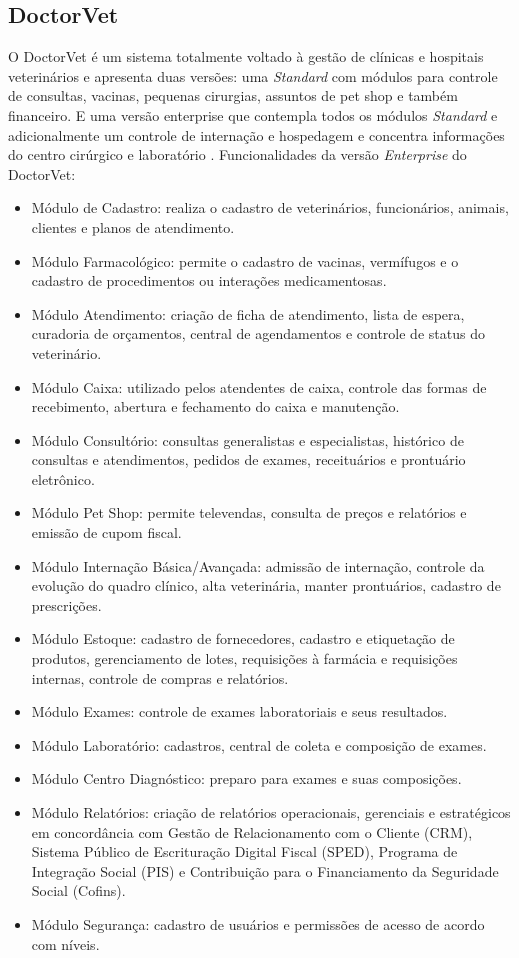 \documentclass[
    12pt,               %
    openright,          %
    oneside,
    a4paper,            %
    BIBLATEX,           %
    TODO,               %
    english,            %
    brazil              %
    ]{ifsp-spo-inf-ctds}
\begin{document}
        \subsection{DoctorVet}
        O DoctorVet é um sistema totalmente voltado à gestão de clínicas e hospitais veterinários e apresenta duas versões: uma \emph{Standard} com módulos para controle de consultas, vacinas, pequenas cirurgias, assuntos de pet shop e também financeiro. E uma versão enterprise que contempla todos os módulos \emph{Standard} e adicionalmente um controle de internação e hospedagem e concentra informações do centro cirúrgico e laboratório .  Funcionalidades da versão \emph{Enterprise} do DoctorVet:

\begin{itemize}
    \item Módulo de Cadastro: realiza o cadastro de veterinários, funcionários, animais, clientes e planos de atendimento.
    \item Módulo Farmacológico: permite o cadastro de vacinas, vermífugos e o cadastro de procedimentos ou interações medicamentosas.
    \item Módulo Atendimento: criação de ficha de atendimento, lista de espera, curadoria de orçamentos, central de   agendamentos e controle de status do veterinário.
    \item Módulo Caixa: utilizado pelos atendentes de caixa, controle das formas de recebimento, abertura e fechamento do caixa e manutenção.
    \item Módulo Consultório: consultas generalistas e especialistas, histórico de consultas e atendimentos, pedidos de exames, receituários e prontuário eletrônico.
    \item Módulo Pet Shop: permite televendas, consulta de preços e relatórios e emissão de cupom fiscal.
    \item Módulo Internação Básica/Avançada: admissão de internação, controle da evolução do quadro clínico, alta veterinária, manter prontuários, cadastro de prescrições.
    \item Módulo Estoque: cadastro de fornecedores, cadastro e etiquetação de produtos, gerenciamento de lotes, requisições à farmácia e requisições internas, controle de compras e relatórios.
    \item Módulo Exames: controle de exames laboratoriais e seus resultados.
    \item Módulo Laboratório: cadastros, central de coleta e composição de exames.
    \item Módulo Centro Diagnóstico: preparo para exames e suas composições.
    \item Módulo Relatórios: criação de relatórios operacionais, gerenciais e estratégicos em concordância com Gestão de Relacionamento com o Cliente (CRM), Sistema Público de Escrituração Digital Fiscal (SPED), Programa de Integração Social (PIS) e Contribuição para o Financiamento da Seguridade Social (Cofins).
    \item Módulo Segurança: cadastro de usuários e permissões de acesso de acordo com níveis.
\end{itemize}
\end{document}
